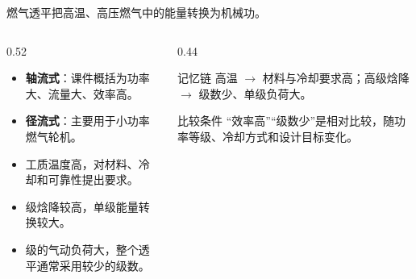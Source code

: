\begin{frame}[t,shrink]{}
燃气透平把高温、高压燃气中的能量转换为机械功。
\begin{columns}[T,onlytextwidth]
\begin{column}{0.52\textwidth}
  \begin{itemize}
    \item \textbf{轴流式}：课件概括为功率大、流量大、效率高。
    \item \textbf{径流式}：主要用于小功率燃气轮机。
    \item 工质温度高，对材料、冷却和可靠性提出要求。
    \item 级焓降较高，单级能量转换较大。
    \item 级的气动负荷大，整个透平通常采用较少的级数。
  \end{itemize}
\end{column}
\begin{column}{0.44\textwidth}
  \begin{keybox}{记忆链}
  \small 高温 $\rightarrow$ 材料与冷却要求高；高级焓降 $\rightarrow$ 级数少、单级负荷大。
  \end{keybox}
  \vspace{0.8mm}
  \begin{amberbox}{比较条件}
  \small “效率高”“级数少”是相对比较，随功率等级、冷却方式和设计目标变化。
  \end{amberbox}
\end{column}
\end{columns}
\end{frame}

